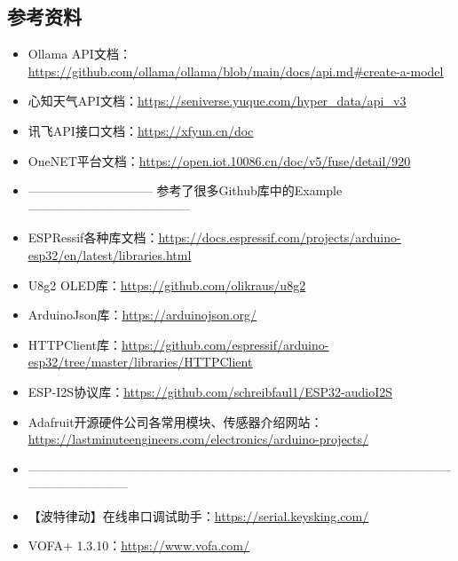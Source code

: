 \subsection{参考资料}
\begin{itemize}
    \item Ollama API文档：\href{https://github.com/ollama/ollama/blob/main/docs/api.md\#create-a-model}{\underline{https://github.com/ollama/ollama/blob/main/docs/api.md\#create-a-model}}
    \item 心知天气API文档：\href{https://seniverse.yuque.com/hyper\_data/api\_v3}{\underline{https://seniverse.yuque.com/hyper\_data/api\_v3}}
    \item 讯飞API接口文档：\href{https://xfyun.cn/doc}{\underline{https://xfyun.cn/doc}}
    \item OneNET平台文档：\href{https://open.iot.10086.cn/doc/v5/fuse/detail/920}{\underline{https://open.iot.10086.cn/doc/v5/fuse/detail/920}}
    \item —————————— 参考了很多Github库中的Example —————————————
    \item ESPRessif各种库文档：\href{https://docs.espressif.com/projects/arduino-esp32/en/latest/libraries.html}{\underline{https://docs.espressif.com/projects/arduino-esp32/en/latest/libraries.html}}
    \item U8g2 OLED库：\href{https://github.com/olikraus/u8g2}{\underline{https://github.com/olikraus/u8g2}}
    \item ArduinoJson库：\href{https://arduinojson.org/}{\underline{https://arduinojson.org/}}
    \item HTTPClient库：\href{https://github.com/espressif/arduino-esp32/tree/master/libraries/HTTPClient}{\underline{https://github.com/espressif/arduino-esp32/tree/master/libraries/HTTPClient}}
    \item ESP-I2S协议库：\href{https://github.com/schreibfaul1/ESP32-audioI2S}{\underline{https://github.com/schreibfaul1/ESP32-audioI2S}}
    \item Adafruit开源硬件公司各常用模块、传感器介绍网站：\href{https://lastminuteengineers.com/electronics/arduino-projects/}{\underline{https://lastminuteengineers.com/electronics/arduino-projects/}}
    \item ——————————————————————————————————————————
    \item 【波特律动】在线串口调试助手：\href{https://serial.keysking.com/}{\underline{https://serial.keysking.com/}}
    \item VOFA+ 1.3.10：\href{https://www.vofa.com/}{\underline{https://www.vofa.com/}}

\end{itemize}
